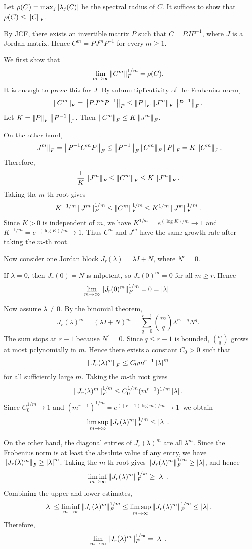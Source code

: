 \begin{pfbox}
Let $\rho(C)=\max_j\left\lvert \lambda_j(C) \right\rvert$ be the spectral radius of $C$.
It suffices to show that $\rho(C)\le\left\lVert C \right\rVert_F$.

By JCF, there exists an invertible matrix $P$ such that $C=PJP^{-1}$,
where $J$ is a Jordan matrix. Hence $C^m=PJ^mP^{-1}$ for every $m\ge 1$.

We first show that
\[
    \lim_{m\to\infty}\left\lVert C^m \right\rVert_F^{1/m}
    =
    \rho(C).
\]
It is enough to prove this for $J$. 
By submultiplicativity of the Frobenius norm,
\[
    \left\lVert C^m \right\rVert_F
    =
    \left\lVert PJ^mP^{-1} \right\rVert_F
    \le
    \left\lVert P \right\rVert_F\left\lVert J^m \right\rVert_F\left\lVert P^{-1} \right\rVert_F.
\]
Let $K=\left\lVert P \right\rVert_F\left\lVert P^{-1} \right\rVert_F$. Then
$\left\lVert C^m \right\rVert_F\le K\left\lVert J^m \right\rVert_F$.

On the other hand,
\[
    \left\lVert J^m \right\rVert_F
    =
    \left\lVert P^{-1}C^mP \right\rVert_F
    \le
    \left\lVert P^{-1} \right\rVert_F\left\lVert C^m \right\rVert_F\left\lVert P \right\rVert_F
    =
    K\left\lVert C^m \right\rVert_F.
\]
Therefore,
\[
    \frac{1}{K}\left\lVert J^m \right\rVert_F
    \le
    \left\lVert C^m \right\rVert_F
    \le
    K\left\lVert J^m \right\rVert_F.
\]
Taking the $m$-th root gives
\[
    K^{-1/m}\left\lVert J^m \right\rVert_F^{1/m}
    \le
    \left\lVert C^m \right\rVert_F^{1/m}
    \le
    K^{1/m}\left\lVert J^m \right\rVert_F^{1/m}.
\]
Since $K>0$ is independent of $m$, we have
$K^{1/m}=e^{(\log K)/m}\to 1$ and
$K^{-1/m}=e^{-(\log K)/m}\to 1$. Thus $C^m$ and $J^m$ have the same
growth rate after taking the $m$-th root.

Now consider one Jordan block $J_r(\lambda)=\lambda I+N$, where $N^r=0$.

If $\lambda=0$, then $J_r(0)=N$ is nilpotent, so $J_r(0)^m=0$ for all
$m\ge r$. Hence
\[
    \lim_{m\to\infty}
    \left\lVert J_r(0)^m \right\rVert_F^{1/m}
    =
    0
    =
    \left\lvert \lambda \right\rvert.
\]

Now assume $\lambda\neq 0$. By the binomial theorem,
\[
    J_r(\lambda)^m
    =
    (\lambda I+N)^m
    =
    \sum_{q=0}^{r-1}
    \binom{m}{q}\lambda^{m-q}N^q.
\]
The sum stops at $r-1$ because $N^r=0$. Since $q\le r-1$ is bounded,
$\binom{m}{q}$ grows at most polynomially in $m$. Hence there exists a
constant $C_0>0$ such that
\[
    \left\lVert J_r(\lambda)^m \right\rVert_F
    \le
    C_0m^{r-1}\left\lvert \lambda \right\rvert^m
\]
for all sufficiently large $m$. Taking the $m$-th root gives
\[
    \left\lVert J_r(\lambda)^m \right\rVert_F^{1/m}
    \le
    C_0^{1/m}(m^{r-1})^{1/m}\left\lvert \lambda \right\rvert.
\]
Since $C_0^{1/m}\to 1$ and
$(m^{r-1})^{1/m}=e^{((r-1)\log m)/m}\to 1$, we obtain
\[
    \limsup_{m\to\infty}
    \left\lVert J_r(\lambda)^m \right\rVert_F^{1/m}
    \le
    \left\lvert \lambda \right\rvert.
\]

On the other hand, the diagonal entries of $J_r(\lambda)^m$ are all
$\lambda^m$. Since the Frobenius norm is at least the absolute value of any
entry, we have $\left\lVert J_r(\lambda)^m \right\rVert_F\ge \left\lvert \lambda \right\rvert^m$. Taking the
$m$-th root gives $\left\lVert J_r(\lambda)^m \right\rVert_F^{1/m}\ge \left\lvert \lambda \right\rvert$, and hence
\[
    \liminf_{m\to\infty}
    \left\lVert J_r(\lambda)^m \right\rVert_F^{1/m}
    \ge
    \left\lvert \lambda \right\rvert.
\]
Combining the upper and lower estimates,
\[
    \left\lvert \lambda \right\rvert
    \le
    \liminf_{m\to\infty}
    \left\lVert J_r(\lambda)^m \right\rVert_F^{1/m}
    \le
    \limsup_{m\to\infty}
    \left\lVert J_r(\lambda)^m \right\rVert_F^{1/m}
    \le
    \left\lvert \lambda \right\rvert.
\]
Therefore,
\[
    \lim_{m\to\infty}
    \left\lVert J_r(\lambda)^m \right\rVert_F^{1/m}
    =
    \left\lvert \lambda \right\rvert.
\]


\end{pfbox}
